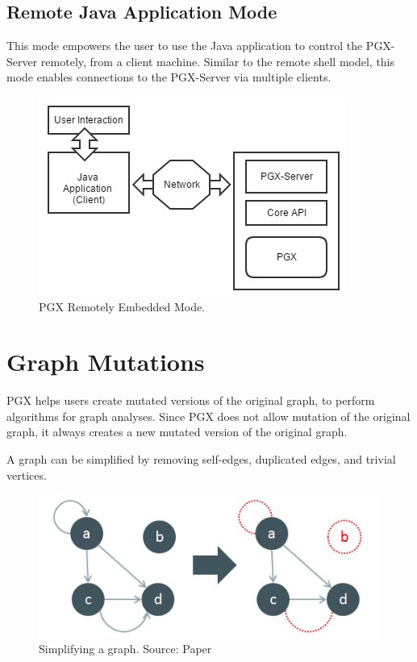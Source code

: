 \documentclass[9pt,twocolumn,twoside]{../../styles/osajnl}
\begin{document}
\subsection{Remote Java Application Mode}
This mode empowers the user to use the Java application to control the
PGX-Server remotely, from a client machine. Similar to the remote
shell model, this mode enables connections to the PGX-Server via
multiple clients.
    \begin{figure}[h]
    \centering \includegraphics[scale=0.6]{images/5} \centering
    \caption{PGX Remotely Embedded Mode.}
    \end{figure}    

\section{Graph Mutations}
PGX helps users create mutated versions of the original graph, to
perform algorithms for graph analyses. Since PGX does not allow
mutation of the original graph, it always creates a new mutated
version of the original graph.

A graph can be simplified by removing self-edges, duplicated edges,
and trivial vertices.
    \begin{figure}[h]
    \centering \includegraphics[scale=0.7]{images/6} \centering
    \caption{Simplifying a graph. Source: Paper \cite{www-mut}}
    \end{figure}
    
\end{document}
